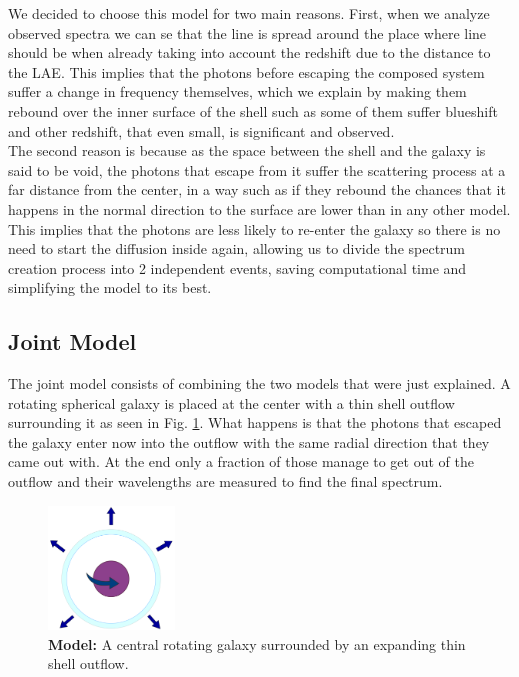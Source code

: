 \documentclass{latex/emulateapj}
\begin{document}
We decided to choose this model for two main reasons. First, when we analyze observed spectra we can se that the line is spread around the place where line should be when already taking into account the redshift due to the distance to the LAE. This implies that the photons before escaping the composed system suffer a change in frequency themselves, which we explain by making them rebound over the inner surface of the shell such as some of them suffer blueshift and other redshift, that even small, is significant and observed.\\

The second reason is because as the space between the shell and the galaxy is said to be void, the photons that escape from it suffer the scattering process at a far distance from the center, in a way such as if they rebound the chances that it happens in the normal direction to the surface are lower than in any other model. This implies that the photons are less likely to re-enter the galaxy so there is no need to start the diffusion inside again, allowing us to divide the spectrum creation process into 2 independent events, saving computational time and simplifying the model to its best. \\

\subsection{Joint Model}

The joint model consists of combining the two models that were just explained. A rotating spherical galaxy is placed at the center with a thin shell outflow surrounding it as seen in Fig. \ref{fig:model}. What happens is that the photons that escaped the galaxy enter now into the outflow with the same radial direction that they came out with. At the end only a fraction of those manage to get out of the outflow and their wavelengths are measured to find the final spectrum.\\

\begin{figure}[h!]
\begin{center}
  \includegraphics[width=0.3\textwidth]{./figures/model.png}
\end{center}
\caption{\textbf{Model:} A central rotating galaxy surrounded by an expanding thin shell outflow.\\
\label{fig:model}}
\end{figure}
\end{document}
